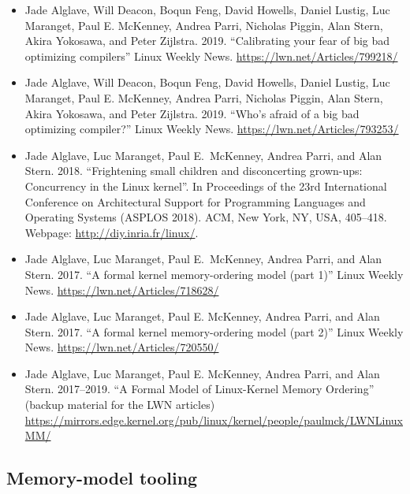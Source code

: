 \begin{itemize}
\item	Jade Alglave, Will Deacon, Boqun Feng, David Howells, Daniel
	Lustig, Luc Maranget, Paul E. McKenney, Andrea Parri, Nicholas
	Piggin, Alan Stern, Akira Yokosawa, and Peter Zijlstra.
	2019. ``Calibrating your fear of big bad optimizing compilers''
	Linux Weekly News.  \url{https://lwn.net/Articles/799218/}

\item	Jade Alglave, Will Deacon, Boqun Feng, David Howells, Daniel
	Lustig, Luc Maranget, Paul E. McKenney, Andrea Parri, Nicholas
	Piggin, Alan Stern, Akira Yokosawa, and Peter Zijlstra.
	2019. ``Who's afraid of a big bad optimizing compiler?''
	Linux Weekly News.  \url{https://lwn.net/Articles/793253/}

\item	Jade Alglave, Luc Maranget, Paul E.~McKenney, Andrea Parri, and
	Alan Stern.  2018. ``Frightening small children and disconcerting
	grown-ups: Concurrency in the Linux kernel''. In Proceedings of
	the 23rd International Conference on Architectural Support for
	Programming Languages and Operating Systems (ASPLOS 2018). ACM,
	New York, NY, USA, 405--418.  Webpage: \url{http://diy.inria.fr/linux/}.

\item	Jade Alglave, Luc Maranget, Paul E.~McKenney, Andrea Parri, and
	Alan Stern.  2017.  ``A formal kernel memory-ordering model (part 1)''
	Linux Weekly News.  \url{https://lwn.net/Articles/718628/}

\item	Jade Alglave, Luc Maranget, Paul E. McKenney, Andrea Parri, and
	Alan Stern.  2017.  ``A formal kernel memory-ordering model (part 2)''
	Linux Weekly News.  \url{https://lwn.net/Articles/720550/}

\item	Jade Alglave, Luc Maranget, Paul E. McKenney, Andrea Parri, and
	Alan Stern.  2017--2019.  ``A Formal Model of Linux-Kernel Memory
	Ordering'' (backup material for the LWN articles)
	\url{https://mirrors.edge.kernel.org/pub/linux/kernel/people/paulmck/LWNLinuxMM/}
\end{itemize}

\subsection{Memory-model tooling}

